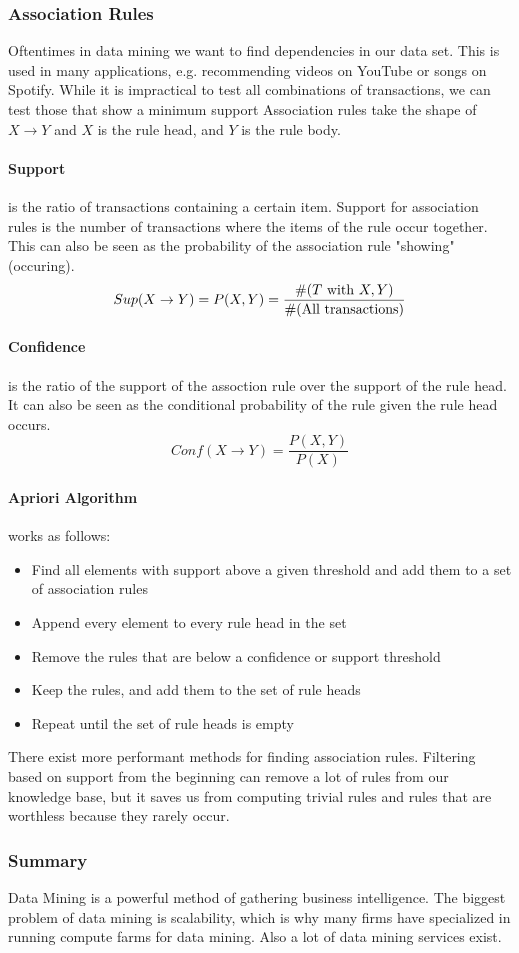 \documentclass{article}
\begin{document}
\subsubsection{Association Rules}
Oftentimes in data mining we want to find dependencies in our data set.
This is used in many applications, e.g. recommending videos on YouTube or songs on Spotify.
While it is impractical to test all combinations of transactions, we can test those that show a minimum support
Association rules take the shape of $X \rightarrow Y$ and $X$ is the rule head, and $Y$ is the rule body.

\paragraph{Support} is the ratio of transactions containing a certain item.
Support for association rules is the number of transactions where the items of the rule occur together.
This can also be seen as the probability of the association rule "showing" (occuring).
\begin{equation}
    Sup(X\rightarrow Y) = {P(X, Y)} = \frac{\#(T\textup{ with } X,Y)}{\#(\textup{All transactions})}
\end{equation}

\paragraph{Confidence} is the ratio of the support of the assoction rule over the support of the rule head.
It can also be seen as the conditional probability of the rule given the rule head occurs.
\begin{equation}
    Conf(X\rightarrow Y) = \frac{P(X, Y)}{P(X)}
\end{equation}

\paragraph{Apriori Algorithm} works as follows:
\begin{itemize}
    \item Find all elements with support above a given threshold and add them to a set of association rules
    \item Append every element to every rule head in the set
    \item Remove the rules that are below a confidence or support threshold
    \item Keep the rules, and add them to the set of rule heads
    \item Repeat until the set of rule heads is empty
\end{itemize}
There exist more performant methods for finding association rules.
Filtering based on support from the beginning can remove a lot of rules from our knowledge base, but it saves us from computing trivial rules and rules that are worthless because they rarely occur.

\subsubsection{Summary}
Data Mining is a powerful method of gathering business intelligence.
The biggest problem of data mining is scalability, which is why many firms have specialized in running compute farms for data mining.
Also a lot of data mining services exist.
\end{document}

